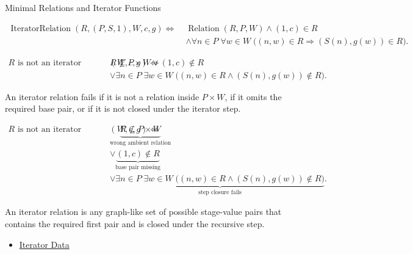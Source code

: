 \begin{topicbox}{Minimal Relations and Iterator Functions}
\begin{remark*}
\[
\begin{aligned}
\operatorname{IteratorRelation}(R,(P,S,1),W,c,g)
\Longleftrightarrow\;&
\operatorname{Relation}(R,P,W)
\land (1,c)\in R\\
&\land
\forall n\in P\;\forall w\in W\;
\bigl((n,w)\in R\Longrightarrow (S(n),g(w))\in R\bigr).
\end{aligned}
\]
\end{remark*}

\begin{remark*}
\[
\begin{aligned}
R \text{ is not an iterator relation for } (W,c,g)
\Longleftrightarrow\;&
R\not\subseteq P\times W
\lor (1,c)\notin R\\
&\lor \exists n\in P\;\exists w\in W\;
\bigl((n,w)\in R\land (S(n),g(w))\notin R\bigr).
\end{aligned}
\]
\end{remark*}

\begin{remark*}
An iterator relation fails if it is not a relation inside $P\times W$, if it
omits the required base pair, or if it is not closed under the iterator step.
\end{remark*}

\begin{remark*}
\[
\begin{aligned}
R \text{ is not an iterator relation for } (W,c,g)
\Longleftrightarrow\;&
\underbrace{R\not\subseteq P\times W}_{\text{wrong ambient relation}}\\
&\lor \underbrace{(1,c)\notin R}_{\text{base pair missing}}\\
&\lor \underbrace{\exists n\in P\;\exists w\in W\;
\bigl((n,w)\in R\land (S(n),g(w))\notin R\bigr)}_{\text{step closure fails}}.
\end{aligned}
\]
\end{remark*}

\begin{remark*}[Interpretation]
An iterator relation is any graph-like set of possible stage-value pairs that
contains the required first pair and is closed under the recursive step.
\end{remark*}

\begin{remark*}[Dependencies]
\begin{itemize}
  \item \hyperref[def:iterator-data-on-peano-system]{Iterator Data}
\end{itemize}
\end{remark*}


\end{topicbox}
